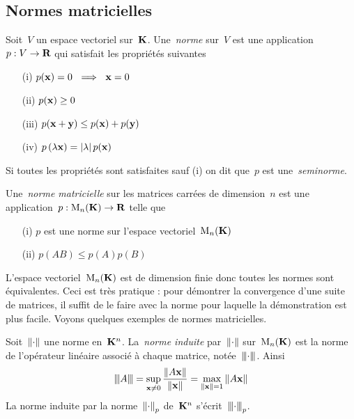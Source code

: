 \clearpage
\subsection{Normes matricielles}


\begin{definition}[norme]
	Soit~$V$ un espace vectoriel sur~$\mathbf{K}$.
	Une~\emph{norme} sur~$V$ est une application~$p:V\to\mathbf{R}$
	qui satisfait les propriétés suivantes
	\begin{enumerate}
		\item[(i)] $p(\mathbf{x}) = 0\ \implies\ \mathbf{x}=0$
		\item[(ii)] $p(\mathbf{x})\ge 0$
		\item[(iii)] $p(\mathbf{x}+\mathbf{y})\le p(\mathbf{x})+p(\mathbf{y})$
		\item[(iv)] $p\left(\lambda\mathbf{x}\right)=\left|\lambda\right|p(\mathbf{x})$
	\end{enumerate}
	Si toutes les propriétés sont satisfaites sauf (i) on dit que~$p$
	est une~\emph{seminorme}.
\end{definition}

\begin{definition}
	Une~\emph{norme matricielle} sur les matrices carrées de dimension~$n$ est
	une application~$p:\mathrm{M}_n(\mathbf{K})\to\mathbf{R}$ telle que
	\begin{enumerate}
		\item[(i)] $p$ est une norme sur l'espace vectoriel~$\mathrm{M}_n(\mathbf{K})$
		\item[(ii)] $p(AB) \le p(A) p(B)$
	\end{enumerate}
\end{definition}

L'espace vectoriel~$\mathrm{M}_n(\mathbf{K})$ est de dimension finie donc toutes les normes
sont équivalentes.  Ceci est très pratique : pour démontrer la convergence
d'une suite de matrices, il suffit de le faire avec la norme pour laquelle la
démonstration est plus facile.  Voyons quelques exemples de normes
matricielles.


\begin{definition}
	Soit~$\left\|\cdot\right\|$ une norme en~$\mathbf{K}^n$.  La~\emph{norme induite}
	par~$\left\|\cdot\right\|$ sur~$\mathrm{M}_n(\mathbf{K})$ est la norme de l'opérateur
	linéaire %
	associé à chaque matrice, notée~${\left\vert\kern-0.25ex\left\vert\kern-0.25ex\left\vert \cdot \right\vert\kern-0.25ex\right\vert\kern-0.25ex\right\vert}$.  Ainsi
	\[
		{\left\vert\kern-0.25ex\left\vert\kern-0.25ex\left\vert A \right\vert\kern-0.25ex\right\vert\kern-0.25ex\right\vert}
		=
		\sup_{\mathbf{x}\neq0}\frac{\left\|A\mathbf{x}\right\|}{\left\|\mathbf{x}\right\|}
		=
		\max_{\left\|\mathbf{x}\right\|=1}\left\|A\mathbf{x}\right\|
	\]
	La norme induite par la norme~$\left\|\cdot\right\|_p$ de~$\mathbf{K}^n$
	s'écrit~${\left\vert\kern-0.25ex\left\vert\kern-0.25ex\left\vert \cdot \right\vert\kern-0.25ex\right\vert\kern-0.25ex\right\vert}_p$.
\end{definition}

